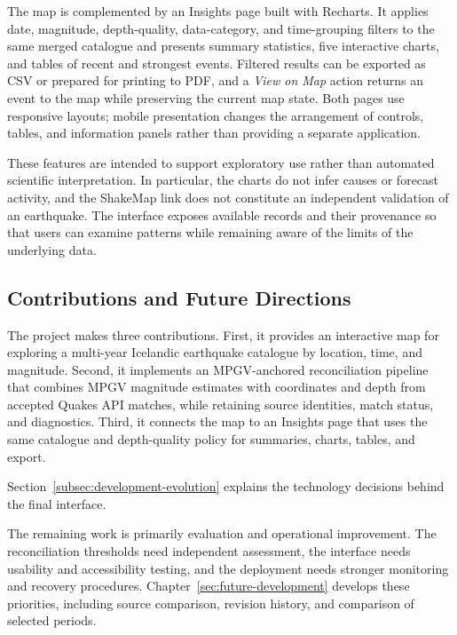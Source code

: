 \documentclass[12pt]{article}
\begin{document}
The map is complemented by an Insights page built with Recharts. It applies date, magnitude, depth-quality, data-category, and time-grouping filters to the same merged catalogue and presents summary statistics, five interactive charts, and tables of recent and strongest events. Filtered results can be exported as CSV or prepared for printing to PDF, and a \emph{View on Map} action returns an event to the map while preserving the current map state. Both pages use responsive layouts; mobile presentation changes the arrangement of controls, tables, and information panels rather than providing a separate application.

These features are intended to support exploratory use rather than automated scientific interpretation. In particular, the charts do not infer causes or forecast activity, and the ShakeMap link does not constitute an independent validation of an earthquake. The interface exposes available records and their provenance so that users can examine patterns while remaining aware of the limits of the underlying data.

\subsection*{Contributions and Future Directions}
The project makes three contributions. First, it provides an interactive map for exploring a multi-year Icelandic earthquake catalogue by location, time, and magnitude. Second, it implements an MPGV-anchored reconciliation pipeline that combines MPGV magnitude estimates with coordinates and depth from accepted Quakes API matches, while retaining source identities, match status, and diagnostics. Third, it connects the map to an Insights page that uses the same catalogue and depth-quality policy for summaries, charts, tables, and export.

Section~\ref{subsec:development-evolution} explains the technology decisions behind the final interface.

The remaining work is primarily evaluation and operational improvement. The reconciliation thresholds need independent assessment, the interface needs usability and accessibility testing, and the deployment needs stronger monitoring and recovery procedures. Chapter~\ref{sec:future-development} develops these priorities, including source comparison, revision history, and comparison of selected periods.

\newpage

\end{document}
